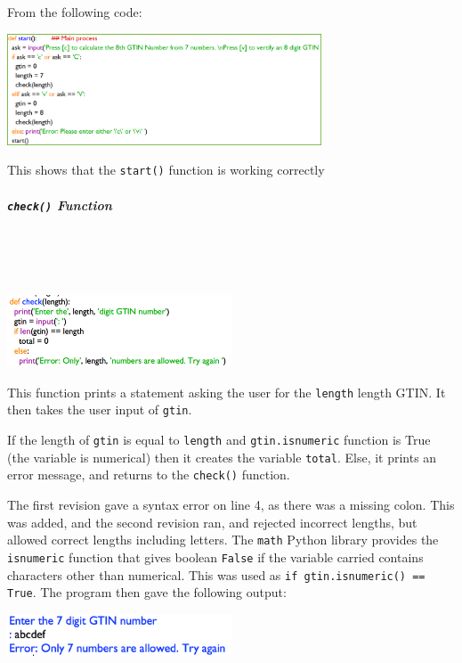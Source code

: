 \documentclass[a4paper]{article}
\begin{document}
From the following code: \par
\noindent\includegraphics[width=0.7\textwidth, left]{task1_start()function.png} \par
This shows that the \verb|start()| function is working correctly
\newpage
\subparagraph{\texttt{check()} Function} ~ \par ~ \par
\noindent\includegraphics[width=0.5\textwidth, left, width=\linewidth, frame]{task1_check()functionDEV.png} \par
This function prints a statement asking the user for the \verb|length| length GTIN. It then takes the user input of \verb|gtin|. \par
If the length of \verb|gtin| is equal to \verb|length| and \verb|gtin.isnumeric| function is True (the variable is numerical) then it creates the variable \verb|total|. Else, it prints an error message, and returns to the \verb|check()| function. \par
The first revision gave a syntax error on line 4, as there was a missing colon. This was added, and the second revision ran, and rejected incorrect lengths, but allowed correct lengths including letters. The \verb|math| Python library provides the \verb|isnumeric| function that gives boolean \verb|False| if the variable carried contains characters other than numerical. This was used as \verb|if gtin.isnumeric() == True|. The program then gave the following output: \par
\noindent\includegraphics[width=0.5\textwidth, left, width=\linewidth, frame]{task1_check()functionDEV1.png} \par
\end{document}
